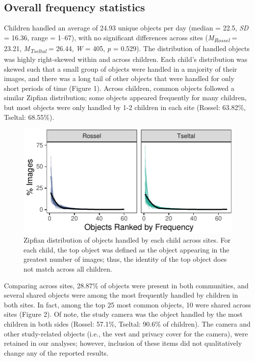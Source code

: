 \documentclass[10pt, letterpaper]{article}
\newenvironment{CodeChunk}{}{}
\begin{document}
\hypertarget{overall-frequency-statistics}{%
\subsection{Overall frequency
statistics}\label{overall-frequency-statistics}}

Children handled an average of 24.93 unique objects per day (median =
22.5, \emph{SD} = 16.36, range = 1--67), with no significant differences
across sites (\emph{M}\textsubscript{\emph{Rossel}} = 23.21,
\emph{M}\textsubscript{\emph{Tseltal}} = 26.44, \emph{W} = 405, \emph{p}
= 0.529). The distribution of handled objects was highly right-skewed
within and across children. Each child's distribution was skewed such
that a small group of objects were handled in a majority of their
images, and there was a long tail of other objects that were handled for
only short periods of time (Figure 1). Across children, common objects
followed a similar Zipfian distribution; some objects appeared
frequently for many children, but most objects were only handled by 1-2
children in each site (Rossel: 63.82\%, Tseltal: 68.55\%).

\begin{CodeChunk}
\begin{figure}[h]

{\centering \includegraphics{figs/zipfian-objects-fig-1} 

}

\caption[Zipfian distribution of objects handled by each child across sites]{Zipfian distribution of objects handled by each child across sites. For each child, the top object was defined as the object appearing in the greatest number of images; thus, the identity of the top object does not match across all children.}\label{fig:zipfian-objects-fig}
\end{figure}
\end{CodeChunk}

Comparing across sites, 28.87\% of objects were present in both
communities, and several shared objects were among the most frequently
handled by children in both sites. In fact, among the top 25 most common
objects, 10 were shared across sites (Figure 2). Of note, the study
camera was the object handled by the most children in both sides
(Rossel: 57.1\%, Tseltal: 90.6\% of children). The camera and other
study-related objects (i.e., the vest and privacy cover for the camera),
were retained in our analyses; however, inclusion of these items did not
qualitatively change any of the reported results.
\end{document}
